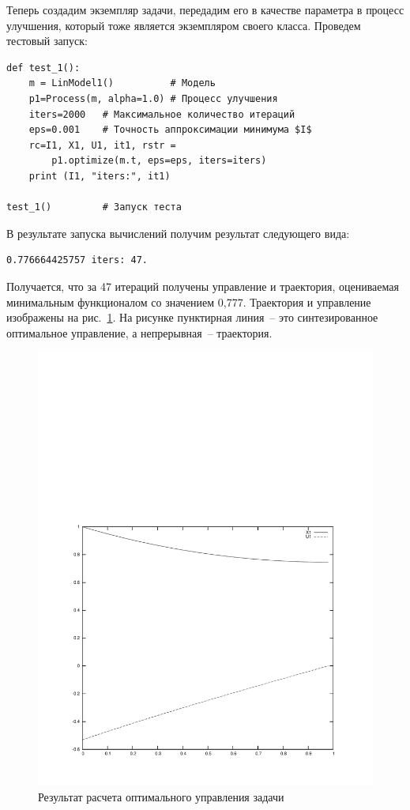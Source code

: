 \documentclass[a4paper,14pt, openany, twoside, draft]{extbook} %
\begin{document}
Теперь создадим экземпляр задачи, передадим его в качестве параметра в процесс улучшения, который тоже является экземпляром своего класса.  Проведем тестовый запуск:

\begin{verbatim}
def test_1():
    m = LinModel1()          # Модель
    p1=Process(m, alpha=1.0) # Процесс улучшения
    iters=2000   # Максимальное количество итераций
    eps=0.001    # Точность аппроксимации минимума $I$
    rc=I1, X1, U1, it1, rstr =
        p1.optimize(m.t, eps=eps, iters=iters)
    print (I1, "iters:", it1)

test_1()         # Запуск теста
\end{verbatim}

В результате запуска вычислений получим результат следующего вида:
\begin{verbatim}
0.776664425757 iters: 47.
\end{verbatim}
Получается, что за 47 итераций получены управление и траектория, оцениваемая минимальным функционалом со значением 0,777.  Траектория и управление изображены на рис.~\ref{fig:result}. На рисунке пунктирная линия~-- это синтезированное оптимальное управление, а непрерывная~-- траектория.
\begin{figure}[hb]
  \centering
  \includegraphics[width=0.7\linewidth]{my-plot}
  \caption{Результат расчета оптимального управления задачи}
  \label{fig:result}
\end{figure}
\end{document}

